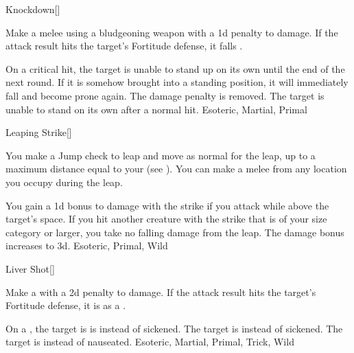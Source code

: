 \lowercase{\hypertarget{maneuver:Knockdown}{}}\label{maneuver:Knockdown}
\hypertarget{maneuver:Knockdown}{}
\begin{freeability}[Rank 1]{Knockdown}[]

Make a melee  using a bludgeoning weapon with a \minus1d penalty to damage.
If the attack result hits the target's Fortitude defense,
it falls .

\rankline
{} On a critical hit, the target is unable to stand up on its own until the end of the next round.
If it is somehow brought into a standing position, it will immediately fall and become prone again.
 The damage penalty is removed.
 The target is unable to stand on its own after a normal hit.
 Esoteric, Martial, Primal
\end{freeability}
\vspace{0.25em}



\lowercase{\hypertarget{maneuver:Leaping Strike}{}}\label{maneuver:Leaping Strike}
\hypertarget{maneuver:Leaping Strike}{}
\begin{freeability}[Rank 1]{Leaping Strike}[]

You make a Jump check to leap and move as normal for the leap, up to a maximum distance equal to your  (see ).
You can make a melee  from any location you occupy during the leap.

\rankline
{} You gain a \plus1d bonus to damage with the strike if you attack while above the target's space.
 If you hit another creature with the strike that is of your size category or larger, you take no falling damage from the leap.
 The damage bonus increases to \plus3d.
 Esoteric, Primal, Wild
\end{freeability}
\vspace{0.25em}



\lowercase{\hypertarget{maneuver:Liver Shot}{}}\label{maneuver:Liver Shot}
\hypertarget{maneuver:Liver Shot}{}
\begin{freeability}[Rank 1]{Liver Shot}[]

Make a  with a \minus2d penalty to damage.
If the attack result hits the target's Fortitude defense,
it is  as a .

\rankline
{} On a , the target is is  instead of sickened.
 The target is  instead of sickened.
 The target is  instead of nauseated.
 Esoteric, Martial, Primal, Trick, Wild
\end{freeability}
\vspace{0.25em}



